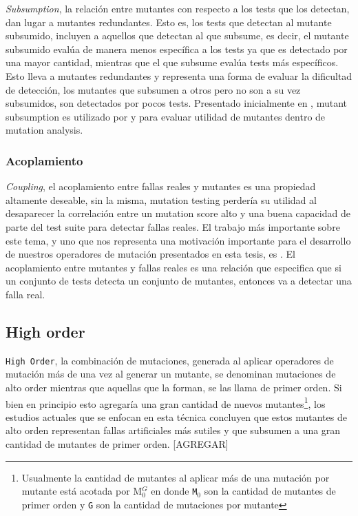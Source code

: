 \emph{Subsumption}, la relaci\'on entre mutantes con respecto a los tests que los detectan, dan lugar a mutantes redundantes. Esto es, los tests que detectan al mutante subsumido, incluyen a aquellos que detectan al que subsume, es decir, el mutante subsumido eval\'ua de manera menos espec\'ifica a los tests ya que es detectado por una mayor cantidad, mientras que el que subsume eval\'ua tests m\'as espec\'ificos. Esto lleva a mutantes redundantes y representa una forma de evaluar la dificultad de detecci\'on, los mutantes que subsumen a otros pero no son a su vez subsumidos, son detectados por pocos tests. Presentado inicialmente en \cite{bibliography.mutation.selection.Offutt96}, mutant subsumption es utilizado por \cite{bibliography.mutation.minimizing.dynamicsubsumption} y \cite{bibliography.mutation.evaluation.JustKA17} para evaluar utilidad de mutantes dentro de mutation analysis.

\subsubsection{Acoplamiento}

\emph{Coupling}, el acoplamiento entre fallas reales y mutantes es una propiedad altamente deseable, sin la misma, mutation testing perder\'ia su utilidad al desaparecer la correlaci\'on entre un mutation score alto y una buena capacidad de parte del test suite para detectar fallas reales. El trabajo m\'as importante sobre este tema, y uno que nos representa una motivaci\'on importante para el desarrollo de nuestros operadores de mutaci\'on presentados en esta tesis, es \cite{bibliography.mutation.evaluation.valid-substitute}. El acoplamiento entre mutantes y fallas reales es una relaci\'on que especifica que si un conjunto de tests detecta un conjunto de mutantes, entonces va a detectar una falla real. 

\subsection{High order}

\texttt{High Order}, la combinaci\'on de mutaciones, generada al aplicar operadores de mutaci\'on m\'as de una vez al generar un mutante, se denominan mutaciones de alto order mientras que aquellas que la forman, se las llama de primer orden. Si bien en principio esto agregar\'ia una gran cantidad de nuevos mutantes\footnote{Usualmente la cantidad de mutantes al aplicar m\'as de una mutaci\'on por mutante est\'a acotada por M$_0^G$ en donde \texttt{M$_0$} son la cantidad de mutantes de primer orden y \texttt{G} son la cantidad de mutaciones por mutante}, los estudios actuales que se enfocan en esta t\'ecnica concluyen que estos mutantes de alto orden representan fallas artificiales m\'as sutiles y que subsumen a una gran cantidad de mutantes de primer orden. [AGREGAR]